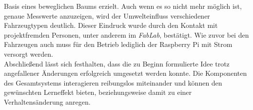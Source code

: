 \documentclass[.../Dokumentation.tex]{subfile}
\begin{document}
Basis eines beweglichen Baums erzielt. Auch wenn es so nicht mehr möglich ist, 
genaue Messwerte anzuzeigen, wird der Umwelteinfluss verschiedener 
Fahrzeugtypen deutlich. Dieser Eindruck wurde durch den Kontakt mit 
projektfremden Personen, unter anderem im \emph{FabLab}, bestätigt. Wie zuvor 
bei den Fahrzeugen auch muss für den Betrieb lediglich der Raspberry Pi mit 
Strom versorgt werden.\\
Abschließend lässt sich festhalten, dass die zu Beginn formulierte Idee trotz 
angefallener Änderungen erfolgreich umgesetzt werden konnte. Die Komponenten 
des Gesamtsystems interagieren reibungslos miteinander und können den 
gewünschten Lerneffekt bieten, beziehungsweise damit zu einer 
Verhaltensänderung anregen.
\end{document}
